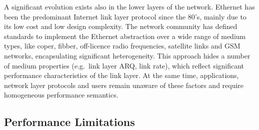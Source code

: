 A significant evolution exists also in the lower layers of the network.
Ethernet has been the predominant Internet link layer protocol since the 80's,
mainly due to its low cost and low design complexity. The network community has
defined standards to implement the Ethernet abstraction over a wide range of
medium types, like coper, fibber, off-licence radio frequencies, satellite links
and GSM networks, encapsulating significant heterogeneity. This approach hides a
number of medium properties (e.g.~link layer ARQ, link rate), which reflect
significant performance characteristics of the link layer. At the same time,
applications, network layer protocols and users remain unaware of these factors
and require homogeneous performance semantics. 


\subsection{Performance Limitations} \label{sec:intro:control_limitations}

